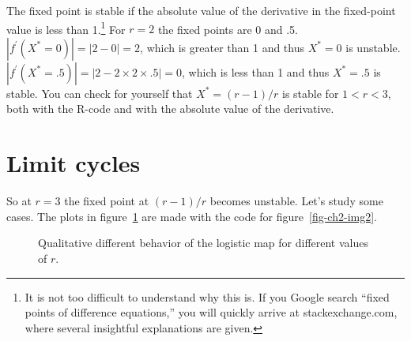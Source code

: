 \documentclass[
  a4paper,
  DIV=11,
  numbers=noendperiod,
  oneside]{scrreprt}
\begin{document}
The fixed point is stable if the absolute value of the derivative in the
fixed-point value is less than 1.\footnote{It is not too difficult to
  understand why this is. If you Google search ``fixed points of
  difference equations,'' you will quickly arrive at stackexchange.com,
  where several insightful explanations are given.} For \(r = 2\) the
fixed points are 0 and .5.
\(\left| f^{'}\left( X^{*} = 0 \right) \right| = |2 - 0| = 2\), which is
greater than 1 and thus \(X^{*} = 0\) is unstable.
\(\left| f^{'}\left( X^{*} = .5 \right) \right| = |2 - 2 \times 2 \times .5| = 0\),
which is less than 1 and thus \(X^{*} = .5\) is stable. You can check
for yourself that \(X^{*}=(r - 1)/r\) is stable for \(1 < r < 3\), both
with the R-code and with the absolute value of the derivative.

\section{Limit cycles}\label{sec-Limit-cycles}

So at \(r = 3\) the fixed point at \((r - 1)/r\) becomes unstable. Let's
study some cases. The plots in figure~\ref{fig-ch2-img4} are made with
the code for figure~\ref{fig-ch2-img2}.

\begin{figure}


\caption{\label{fig-ch2-img4}Qualitative different behavior of the
logistic map for different values of \(r\).}

\end{figure}%
\end{document}

